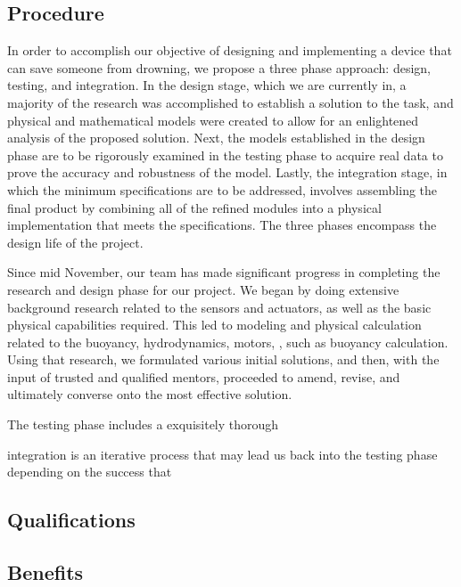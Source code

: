 \documentclass[11pt]{article}
\begin{document}
\subsection*{Procedure}


In order to accomplish our objective of designing and implementing a device that can save someone from drowning, we propose a three phase approach: design, testing, and integration. In the design stage, which we are currently in, a majority of the research was accomplished to establish a solution to the task, and physical and mathematical models were created to allow for an enlightened analysis of the proposed solution. Next, the models established in the design phase are to be rigorously examined in the testing phase to acquire real data to prove the accuracy and robustness of the model. Lastly, the integration stage, in which the minimum specifications are to be addressed, involves assembling the final product by combining all of the refined modules into a physical implementation that meets the specifications. The three phases encompass the design life of the project. 

Since mid November, our team has made significant progress in completing the research and design phase for our project. We began by doing extensive background research related to the sensors and actuators, as well as the basic physical capabilities  required. This led to modeling and physical calculation related to the buoyancy, hydrodynamics, motors,  , such as buoyancy calculation. Using that research, we formulated various initial solutions, and then, with the input of trusted and qualified mentors, proceeded to amend, revise, and ultimately converse onto the most effective  solution.

The testing phase includes a exquisitely thorough 


integration is an iterative process that may lead us back into the testing phase depending on the success that 


\subsection*{Qualifications}

\subsection*{Benefits}
\end{document}
